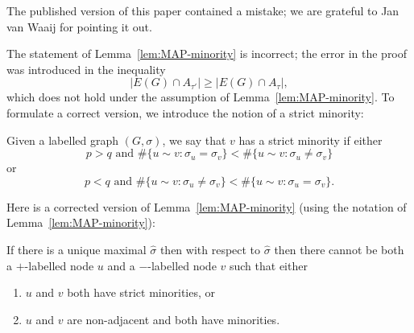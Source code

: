 \documentclass[EJP]{ejpecp}
\newcommand{\1}[1]{\mathbbm{1}_{\{#1\}}}
\begin{document}
The published version of this paper contained a mistake; we are grateful to Jan van Waaij for
pointing it out.

The statement of Lemma~\ref{lem:MAP-minority} is incorrect; the error in the proof was introduced in the inequality
\[
    |E(G) \cap A_{\tau'}| \ge |E(G) \cap A_\tau|,
\]
which does not hold under the assumption of Lemma~\ref{lem:MAP-minority}.
To formulate a correct version, we introduce the notion of a strict minority:
\begin{definition}
    Given a labelled graph $(G, \sigma)$, we say that $v$ has a strict minority if either
    \[
        p > q \text{ and } \#\{u \sim v: \sigma_u = \sigma_v\} < \#\{u \sim v: \sigma_u \ne \sigma_v\} 
    \]
    or
    \[
        p < q \text{ and } \#\{u \sim v: \sigma_u \ne \sigma_v\} < \#\{u \sim v: \sigma_u = \sigma_v\} .
    \]
\end{definition}

Here is a corrected version of Lemma~\ref{lem:MAP-minority} (using the notation of Lemma~\ref{lem:MAP-minority}):

\begin{lemma}\label{lem:MAP-minority-correct}
    If there is a unique maximal $\hat \sigma$ then with respect to $\hat \sigma$ then there cannot
    be both a $+$-labelled node $u$ and a $-$-labelled node $v$ such that either
    \begin{enumerate}
        \item $u$ and $v$ both have strict minorities, or
        \item $u$ and $v$ are non-adjacent and both have minorities.
    \end{enumerate}
\end{lemma}
\end{document}
